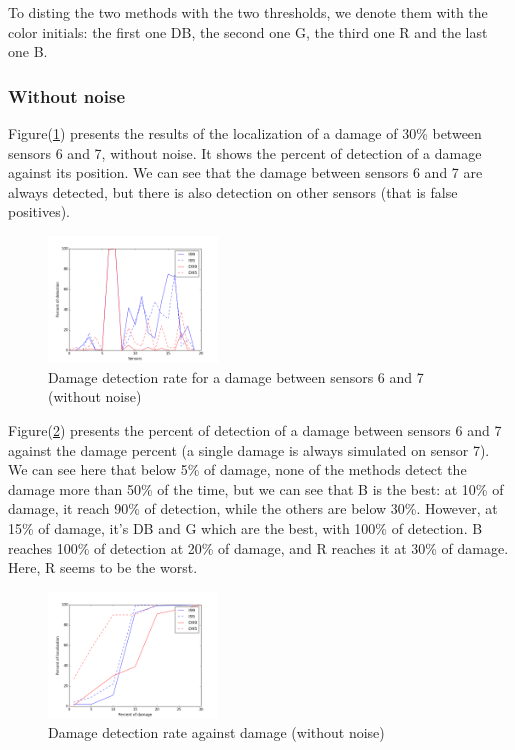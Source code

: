 \documentclass[journal]{IEEEtran}
\begin{document}
To disting the two methods with the two thresholds, we denote them with the color initials: the first one DB, the second one G, the third one R and the last one B.

\subsubsection{Without noise}

Figure(\ref{damage30}) presents the results of the localization of a damage of 30\% between sensors 6 and 7, without noise.
It shows the percent of detection of a damage against its position.
We can see that the damage between sensors 6 and 7 are always detected, but there is also detection on other sensors (that is false positives).

\begin{figure}[h!]
  \centering
  \includegraphics[width=0.4\textwidth]{images/damage30percent.png}
  \caption{Damage detection rate for a damage between sensors 6 and 7 (without noise)}
  \label{damage30}
\end{figure}



Figure(\ref{detect}) presents the percent of detection of a damage between sensors 6 and 7 against the damage percent (a single damage is always simulated on sensor 7). We can see here that below 5\% of damage, none of the methods detect the damage more than 50\% of the time, but we can see that B is the best: at 10\% of damage, it reach 90\% of detection, while the others are below 30\%. However, at 15\% of damage, it's DB and G which are the best, with 100\% of detection. B reaches 100\% of detection at 20\% of damage, and R reaches it at 30\% of damage. Here, R seems to be the worst.

\begin{figure}[h!]
  \centering
  \includegraphics[width=0.4\textwidth]{images/detect.png}
  \caption{Damage detection rate against damage (without noise)}
  \label{detect}
\end{figure}
\end{document}
